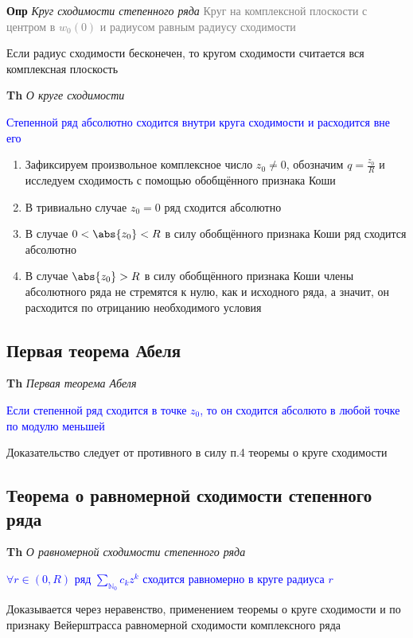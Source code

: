 \textbf{Опр} \textit{Круг сходимости степенного ряда} \textcolor{gray}{Круг на комплексной плоскости с центром
в $w_0 (0)$ и радиусом равным радиусу сходимости}

Если радиус сходимости бесконечен, то кругом сходимости считается вся комплексная плоскость

\textbf{Th} \textit{О круге сходимости}

\textcolor{blue}{Степенной ряд абсолютно сходится внутри круга сходимости и расходится вне его}

\begin{enumerate}
    \item Зафиксируем произвольное комплексное число $z_0 \neq 0$, обозначим $q = \frac{z_0}{R}$ и исследуем
    сходимость с помощью обобщённого признака Коши
    \item В тривиально случае $z_0 = 0$ ряд сходится абсолютно
    \item В случае $0 < \abs{z_0} < R$ в силу обобщённого признака Коши ряд сходится абсолютно
    \item В случае $\abs{z_0} > R$ в силу обобщённого признака Коши члены абсолютного ряда не стремятся к нулю,
    как и исходного ряда, а значит, он расходится по отрицанию необходимого условия
\end{enumerate}

\subsection{Первая теорема Абеля}

\textbf{Th} \textit{Первая теорема Абеля}

\textcolor{blue}{Если степенной ряд сходится в точке $z_0$, то он сходится абсолюто в любой точке по модулю
меньшей}

Доказательство следует от противного в силу п.4 теоремы о круге сходимости

\subsection{Теорема о равномерной сходимости степенного ряда}

\textbf{Th} \textit{О равномерной сходимости степенного ряда}

\textcolor{blue}{$\forall r \in (0, R)$ ряд $\sum_{\mathbb{N}}_0 c_k z^k$ сходится равномерно в круге радиуса $r$}

Доказывается через неравенство, применением теоремы о круге сходимости и по признаку Вейерштрасса равномерной
сходимости комплексного ряда

